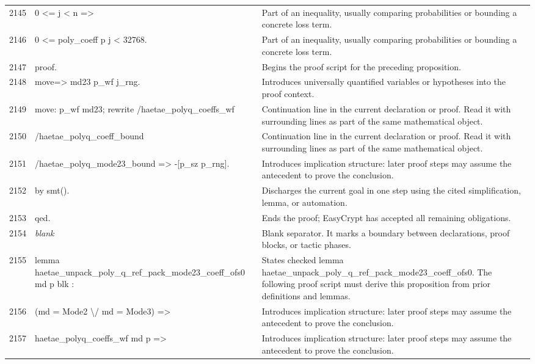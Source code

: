 \documentclass[10pt]{article}
\begin{document}
\begin{longtable}{r L{0.53\textwidth} L{0.37\textwidth}}
2145 & {\ttfamily\scriptsize   0 <= j < n =>} & Part of an inequality, usually comparing probabilities or bounding a concrete loss term. \\
2146 & {\ttfamily\scriptsize   0 <= poly\_coeff p j < 32768.} & Part of an inequality, usually comparing probabilities or bounding a concrete loss term. \\
2147 & {\ttfamily\scriptsize proof.} & Begins the proof script for the preceding proposition. \\
2148 & {\ttfamily\scriptsize move=> md23 p\_wf j\_rng.} & Introduces universally quantified variables or hypotheses into the proof context. \\
2149 & {\ttfamily\scriptsize move: p\_wf md23; rewrite /haetae\_polyq\_coeffs\_wf} & Continuation line in the current declaration or proof.  Read it with surrounding lines as part of the same mathematical object. \\
2150 & {\ttfamily\scriptsize                     /haetae\_polyq\_coeff\_bound} & Continuation line in the current declaration or proof.  Read it with surrounding lines as part of the same mathematical object. \\
2151 & {\ttfamily\scriptsize                     /haetae\_polyq\_mode23\_bound => -[p\_sz p\_rng].} & Introduces implication structure: later proof steps may assume the antecedent to prove the conclusion. \\
2152 & {\ttfamily\scriptsize by smt().} & Discharges the current goal in one step using the cited simplification, lemma, or automation. \\
2153 & {\ttfamily\scriptsize qed.} & Ends the proof; EasyCrypt has accepted all remaining obligations. \\
2154 & {\ttfamily\scriptsize \emph{blank}} & Blank separator.  It marks a boundary between declarations, proof blocks, or tactic phases. \\
2155 & {\ttfamily\scriptsize lemma haetae\_unpack\_poly\_q\_ref\_pack\_mode23\_coeff\_ofs0 md p blk :} & States checked lemma haetae\_unpack\_poly\_q\_ref\_pack\_mode23\_coeff\_ofs0.  The following proof script must derive this proposition from prior definitions and lemmas. \\
2156 & {\ttfamily\scriptsize   (md = Mode2 \textbackslash{}/ md = Mode3) =>} & Introduces implication structure: later proof steps may assume the antecedent to prove the conclusion. \\
2157 & {\ttfamily\scriptsize   haetae\_polyq\_coeffs\_wf md p =>} & Introduces implication structure: later proof steps may assume the antecedent to prove the conclusion. \\

\end{longtable}
\end{document}
